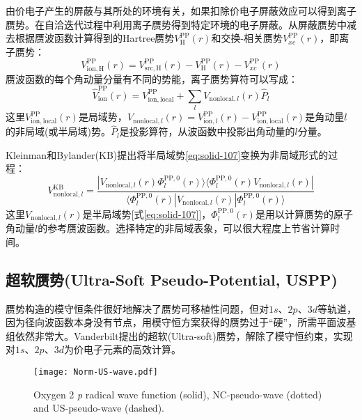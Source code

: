 由价电子产生的屏蔽与其所处的环境有关，如果扣除价电子屏蔽效应可以得到离子赝势。在自洽迭代过程中利用离子赝势得到特定环境的电子屏蔽。从屏蔽赝势中减去根据赝波函数计算得到的Hartree赝势$V_{\mathrm{H}}^{\mathrm{PP}}(r)$和交换-相关赝势$V_{xc}^{\mathrm{PP}}(r)$，即离子赝势\cite{PRB43-1993_1991}：
$$V_{\mathrm{ion},\mathrm{H}}^{\mathrm{PP}}(r)=V_{\mathrm{src},\mathrm{H}}^{\mathrm{PP}}(r)-V_{\mathrm{H}}^{\mathrm{PP}}(r)-V_{xc}^{\mathrm{PP}}(r)$$
赝波函数的每个角动量分量有不同的势能，离子赝势算符可以写成：
\begin{equation}
	\hat V_{\mathrm{ion}}^{\mathrm{PP}}(r)=V_{\mathrm{ion},\mathrm{local}}^{\mathrm{PP}}+\sum_lV_{\mathrm{nonlocal},l}(r)\hat P_l
  \label{eq:solid-107}
\end{equation}
这里$V_{\mathrm{ion},\mathrm{local}}^{\mathrm{PP}}(r)$是局域势，$V_{\mathrm{nonlocal},l}(r)=V_{\mathrm{ion},l}^{\mathrm{PP}}(r)-V_{\mathrm{ion},\mathrm{local}}^{\mathrm{PP}}(r)$是角动量$l$的非局域(或半局域)势。$\hat P_l$是投影算符，从波函数中投影出角动量的$l$分量。

\textrm{Kleinman}和\textrm{Bylander}\textrm{(KB)}\cite{PRL48-1425_1982}提出将半局域势\eqref{eq:solid-107}变换为非局域形式的过程：
$$V_{\mathrm{nonlocal},l}^{\mathrm{KB}}=\dfrac{|V_{\mathrm{nonlocal},l}(r)\Phi_l^{\mathrm{PP},0}(r)\rangle\langle\Phi_l^{\mathrm{PP},0}(r)V_{\mathrm{nonlocal},l}(r)|}{\langle\Phi_l^{\mathrm{PP},0}(r)|V_{\mathrm{nonlocal},l}(r)|\Phi_l^{\mathrm{PP},0}(r)\rangle}$$
这里$V_{\mathrm{nonlocal},l}(r)$是半局域势[式\eqref{eq:solid-107}]，$\Phi_l^{\mathrm{PP},0}(r)$是用以计算赝势的原子角动量$l$的参考赝波函数。选择特定的非局域表象，可以很大程度上节省计算时间。

\subsection{超软赝势\textrm{(Ultra-Soft Pseudo-Potential, USPP)}}
赝势构造的模守恒条件很好地解决了赝势可移植性问题，但对$1s$、$2p$、$3d$等轨道，因为径向波函数本身没有节点，用模守恒方案获得的赝势过于“硬”，所需平面波基组依然非常大。\textrm{Vanderbilt}提出的超软\textrm{(Ultra-soft)}赝势\cite{PRB41-7892_1990}，解除了模守恒约束，实现对$1s$、$2p$、$3d$为价电子元素的高效计算。
\begin{figure}[h!]
\centering
\texttt{[image: Norm-US-wave.pdf]}
\caption{\small \textrm{Oxygen 2} \textit{p} \textrm{radical wave function (solid), NC-pseudo-wave (dotted) and US-pseudo-wave (dashed).}}%
\label{Norm-US-wave}
\end{figure}

